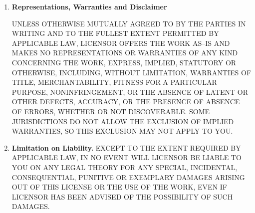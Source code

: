 \documentclass[12pt,letterpaper,oneside,final]{memoir}
\begin{document}
\begin{appendices}
\begin{enumerate}[1.]
\item \textbf{Representations, Warranties and Disclaimer}

\begin{midsloppypar}
UNLESS OTHERWISE MUTUALLY AGREED TO BY THE PARTIES IN WRITING AND TO THE FULLEST EXTENT PERMITTED BY APPLICABLE LAW, LICENSOR OFFERS THE WORK AS--IS AND MAKES NO REPRESENTATIONS OR WARRANTIES OF ANY KIND CONCERNING THE WORK, EXPRESS, IMPLIED, STATUTORY OR OTHERWISE, INCLUDING, WITHOUT LIMITATION, WARRANTIES OF TITLE, MERCHANTABILITY, FITNESS FOR A PARTICULAR PURPOSE, NONINFRINGEMENT, OR THE ABSENCE OF LATENT OR OTHER DEFECTS, ACCURACY, OR THE PRESENCE OF ABSENCE OF ERRORS, WHETHER OR NOT DISCOVERABLE. SOME JURISDICTIONS DO NOT ALLOW THE EXCLUSION OF IMPLIED WARRANTIES, SO THIS EXCLUSION MAY NOT APPLY TO YOU.
\end{midsloppypar}

\item \textbf{Limitation on Liability.} EXCEPT TO THE EXTENT REQUIRED BY APPLICABLE LAW, IN NO EVENT WILL LICENSOR BE LIABLE TO YOU ON ANY LEGAL THEORY FOR ANY SPECIAL, INCIDENTAL, CONSEQUENTIAL, PUNITIVE OR EXEMPLARY DAMAGES ARISING OUT OF THIS LICENSE OR THE USE OF THE WORK, EVEN IF LICENSOR HAS BEEN ADVISED OF THE POSSIBILITY OF SUCH DAMAGES.


\end{enumerate}
\end{appendices}
\end{document}
